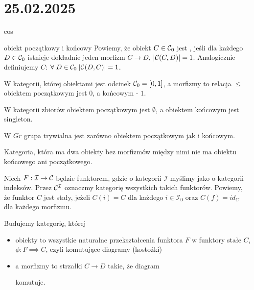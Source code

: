 \section{25.02.2025}{cos}

\begin{definition}{obiekt początkowy i końcowy}{}
  Powiemy, że obiekt $C\in \mathcal{C}_0$ jest , jeśli dla każdego $D\in\mathcal{C}_0$ istnieje dokładnie jeden morfizm $C\to D$, $|\mathcal{C}(C, D)|=1$. Analogicznie definiujemy  $C$: $\forall\;D\in\mathcal{C}_0\;|\mathcal{C}(D, C)|=1$.
\end{definition}

\begin{example}[m]
  \item W kategorii, której obiektami jest odcinek $\mathcal{C}_0=[0,1]$, a morfizmy to relacja $\leq$ obiektem początkowym jest $0$, a końcowym - $1$.
  \item W kategorii zbiorów obiektem początkowym jest $\emptyset$, a obiektem końcowym jest singleton.
  \item W $Gr$ grupa trywialna jest zarówno obiektem początkowym jak i końcowym.
  \item Kategoria, która ma dwa obiekty bez morfizmów między nimi nie ma obiektu końcowego ani początkowego.
\end{example}

Niech $F:\mathcal{I}\to \mathcal{C}$ będzie funktorem, gdzie o kategorii $\mathcal{I}$ myślimy jako o kategorii indeksów. Przez $\mathcal{C}^{\mathcal{I}}$ oznaczmy kategorię wszystkich takich funktorów. 
Powiemy, że funktor $C$ jest stały, jeżeli $C(i)=C$ dla każdego $i\in\mathcal{I}_0$ oraz $C(f)=id_C$ dla każdego morfizmu.

Budujemy kategorię, której 
\begin{itemize}
  \item obiekty to wszystkie naturalne przekształcenia funktora $F$ w funktory stałe $C$, $\phi:F\implies C$, czyli komutujące diagramy (kostożki) 
    \begin{center}
    \end{center}
  \item a morfizmy to strzałki $C\to D$ takie, że diagram
    \begin{center}
    \end{center}
    komutuje.
\end{itemize}

